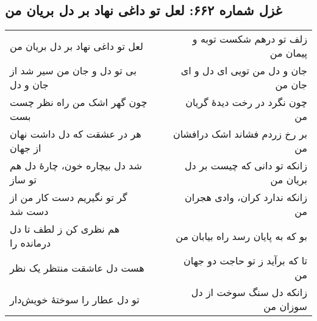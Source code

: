 \begin{center}
\section*{غزل شماره ۶۶۲: لعل تو داغی نهاد بر دل بریان من}
\label{sec:662}
\begin{longtable}{l p{0.5cm} r}
لعل تو داغی نهاد بر دل بریان من
&&
زلف تو درهم شکست توبه و پیمان من
\\
بی تو دل و جان من سیر شد از جان و دل
&&
جان و دل من تویی ای دل و ای جان من
\\
چون گهر اشک من راه نظر چست بست
&&
چون نگرد در رخت دیدهٔ گریان من
\\
هر در عشقت که دل داشت نهان از جهان
&&
بر رخ زردم فشاند اشک درافشان من
\\
شد دل بیچاره خون، چارهٔ دل هم تو ساز
&&
زانکه تو دانی که چیست بر دل بریان من
\\
گر تو نگیریم دست کار من از دست شد
&&
زانکه ندارد کران، وادی هجران من
\\
هم نظری کن ز لطف تا دل درمانده را
&&
بو که به پایان رسد راه بیابان من
\\
هست دل عاشقت منتظر یک نظر
&&
تا که برآید ز تو حاجت دو جهان من
\\
تو دل عطار را سوختهٔ خویش‌دار
&&
زانکه دل سنگ سوخت از دل سوزان من
\\
\end{longtable}
\end{center}
